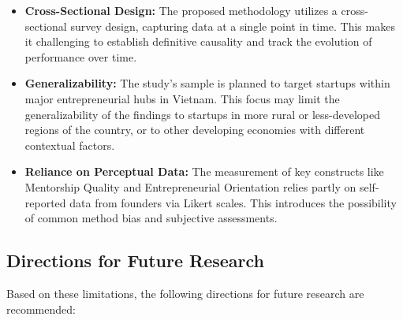 \documentclass[../Main.tex]{subfiles}
\begin{document}
	\begin{itemize}
		\item \textbf{Cross-Sectional Design:} The proposed methodology utilizes a cross-sectional survey design, capturing data at a single point in time. This makes it challenging to establish definitive causality and track the evolution of performance over time.
		
		\item \textbf{Generalizability:} The study's sample is planned to target startups within major entrepreneurial hubs in Vietnam. This focus may limit the generalizability of the findings to startups in more rural or less-developed regions of the country, or to other developing economies with different contextual factors.
		
		\item \textbf{Reliance on Perceptual Data:} The measurement of key constructs like Mentorship Quality and Entrepreneurial Orientation relies partly on self-reported data from founders via Likert scales. This introduces the possibility of common method bias and subjective assessments.
	\end{itemize}
	
	\subsection{Directions for Future Research}
	
	Based on these limitations, the following directions for future research are recommended:
	
\end{document}
